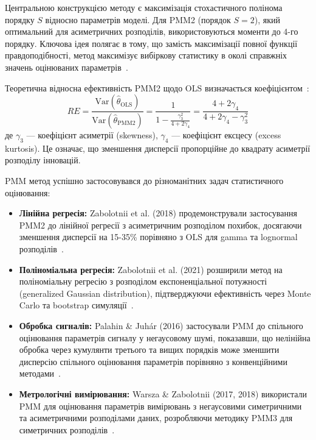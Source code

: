 \documentclass[12pt,a4paper]{article}
\begin{document}
	Центральною конструкцією методу є максимізація стохастичного полінома порядку $S$ відносно параметрів моделі. Для PMM2 (порядок $S=2$), який оптимальний для асиметричних розподілів, використовуються моменти до 4-го порядку. Ключова ідея полягає в тому, що замість максимізації повної функції правдоподібності, метод максимізує вибіркову статистику в околі справжніх значень оцінюваних параметрів~\cite{kunchenko2002polynomial,kunchenko2006stochastic}.
	
	Теоретична відносна ефективність PMM2 щодо OLS визначається коефіцієнтом~\cite{zabolotnii2018polynomial}:
	\begin{equation}
		\label{eq:relative_efficiency}
		RE = \frac{\text{Var}(\hat{\theta}_{\text{OLS}})}{\text{Var}(\hat{\theta}_{\text{PMM2}})} = \frac{1}{1 - \frac{\gamma_3^2}{4+2\gamma_4}} = \frac{4 + 2\gamma_4}{4 + 2\gamma_4 - \gamma_3^2}
	\end{equation}
	де $\gamma_3$ --- коефіцієнт асиметрії (skewness), $\gamma_4$ --- коефіцієнт ексцесу (excess kurtosis). Це означає, що зменшення дисперсії пропорційне до квадрату асиметрії розподілу інновацій.
	
	PMM метод успішно застосовувався до різноманітних задач статистичного оцінювання:
	
	\begin{itemize}
		\item \textbf{Лінійна регресія:} Zabolotnii et al. (2018) продемонстрували застосування PMM2 до лінійної регресії з асиметричним розподілом похибок, досягаючи зменшення дисперсії на 15-35\% порівняно з OLS для gamma та lognormal розподілів~\cite{zabolotnii2018polynomial}.
		
		\item \textbf{Поліноміальна регресія:} Zabolotnii et al. (2021) розширили метод на поліноміальну регресію з розподілом експоненціальної потужності (generalized Gaussian distribution), підтверджуючи ефективність через Monte Carlo та bootstrap симуляції~\cite{zabolotnii2021estimating}.
		
		\item \textbf{Обробка сигналів:} Palahin \& Juhár (2016) застосували PMM до спільного оцінювання параметрів сигналу у негаусовому шумі, показавши, що нелінійна обробка через кумулянти третього та вищих порядків може зменшити дисперсію спільного оцінювання параметрів порівняно з конвенційними методами~\cite{palahin2016joint}.
		
		\item \textbf{Метрологічні вимірювання:} Warsza \& Zabolotnii (2017, 2018) використали PMM для оцінювання параметрів вимірювань з негаусовими симетричними та асиметричними розподілами даних, розробляючи методику PMM3 для симетричних розподілів~\cite{warsza2017polynomial,zabolotnii2020estimation}.
	\end{itemize}
	
\end{document}
